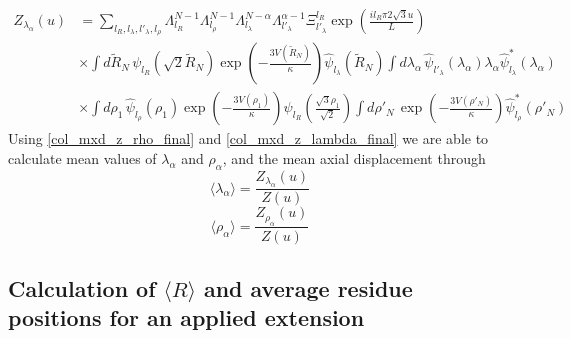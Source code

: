\begin{equation}\label{col_mxd_z_lambda_final}
\begin{split}
Z_{\lambda_\alpha}\left(u\right) &= \sum_{l_R,l_\lambda,l'_\lambda,l_\rho}\Lambda_{l_R}^{N-1}\Lambda_{l_\rho}^{N-1}\Lambda_{l_\lambda}^{N-\alpha}\Lambda_{l'_\lambda}^{\alpha-1}\Xi^{l_{R}}_{l'_{\lambda}}\exp\left(\frac{il_{R}\pi 2\sqrt{3}u}{L}\right)\\
&\times\int d\tilde{R}_N\,\psi_{l_R}\left(\sqrt{2}\tilde{R}_{N}\right)\exp\left(-\frac{3V\left(\tilde{R}_N\right)}{\kappa}\right)\hat{\psi}_{l_\lambda}\left(\tilde{R}_N\right)\int d\lambda_{\alpha}\,\hat{\psi}_{l'_{\lambda}}\left(\lambda_\alpha\right)\lambda_{\alpha} \hat{\psi}^{*}_{l_\lambda}\left(\lambda_{\alpha}\right)\\
&\times\int d\rho_1\, \hat{\psi}_{l_\rho}\left(\rho_{1}\right) \exp\left(-\frac{3V(\rho_{1})}{\kappa}\right)\psi_{l_R}\left( \frac{\sqrt{3}\rho_1}{\sqrt{2}}\right)\int d\rho'_N\,\exp\left(-\frac{3V(\rho'_{N})}{\kappa}\right)\hat{\psi}^{*}_{l_\rho}\left(\rho'_{N}\right)
\end{split}
\end{equation}
%
Using \eqref{col_mxd_z_rho_final} and \eqref{col_mxd_z_lambda_final} we are able to calculate mean values of $\lambda_\alpha$ and $\rho_\alpha$, and the mean axial displacement through
%
\begin{equation}
\langle\lambda_{\alpha}\rangle = \frac{Z_{\lambda_\alpha}\left(u\right)}{Z\left(u\right)}
\end{equation}  
%
\begin{equation}
\langle\rho_{\alpha}\rangle = \frac{Z_{\rho_\alpha}\left(u\right)}{Z\left(u\right)}
\end{equation}   
%
\subsection{Calculation of $\langle R \rangle$ and average residue positions for an applied extension}

